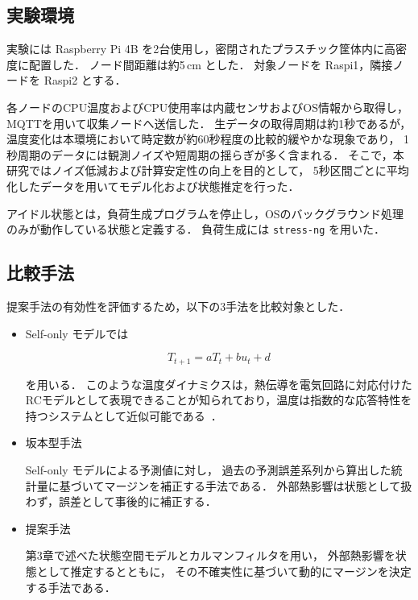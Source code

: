 \documentclass[techrep]{ipsj}
\begin{document}
\subsection{実験環境}

実験には Raspberry Pi 4B を2台使用し，密閉されたプラスチック筐体内に高密度に配置した．
ノード間距離は約5\,cm とした．
対象ノードを Raspi1，隣接ノードを Raspi2 とする．

各ノードのCPU温度およびCPU使用率は内蔵センサおよびOS情報から取得し，MQTTを用いて収集ノードへ送信した．
生データの取得周期は約1秒であるが，温度変化は本環境において時定数が約60秒程度の比較的緩やかな現象であり，
1秒周期のデータには観測ノイズや短周期の揺らぎが多く含まれる．
そこで，本研究ではノイズ低減および計算安定性の向上を目的として，
5秒区間ごとに平均化したデータを用いてモデル化および状態推定を行った．

アイドル状態とは，負荷生成プログラムを停止し，OSのバックグラウンド処理のみが動作している状態と定義する．
負荷生成には \texttt{stress-ng} を用いた．

\subsection{比較手法}

提案手法の有効性を評価するため，以下の3手法を比較対象とした．

\begin{itemize}
    \item Self-only モデルでは

\begin{equation}
T_{t+1} = aT_t + bu_t + d
\end{equation}

を用いる．
このような温度ダイナミクスは，熱伝導を電気回路に対応付けたRCモデルとして表現できることが知られており，温度は指数的な応答特性を持つシステムとして近似可能である~\cite{skadron2003temperature}．

    \item 坂本型手法  

    Self-only モデルによる予測値に対し，
    過去の予測誤差系列から算出した統計量に基づいてマージンを補正する手法である．
    外部熱影響は状態として扱わず，誤差として事後的に補正する．

    \item 提案手法 
    
    第3章で述べた状態空間モデルとカルマンフィルタを用い，
    外部熱影響を状態として推定するとともに，
    その不確実性に基づいて動的にマージンを決定する手法である．
\end{itemize}
\end{document}
